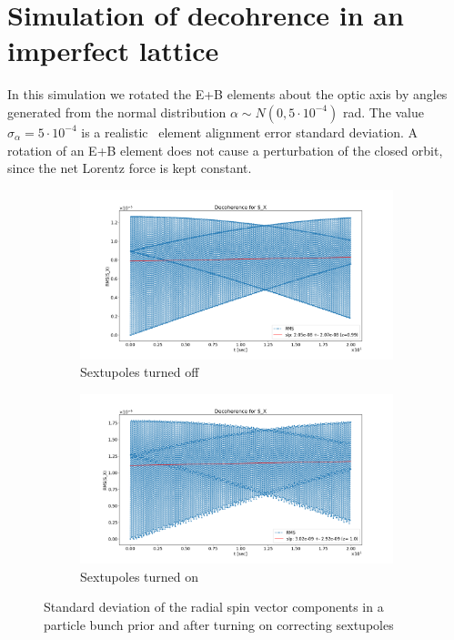 \documentclass[a4paper]{jacow}
\begin{document}
\section{Simulation of decohrence in an imperfect lattice}
In this simulation we rotated the E+B elements about the optic axis by angles generated from the normal distribution $\alpha \sim N(0, 5\cdot 10^{-4})$ rad. The value $\sigma_\alpha = 5\cdot 10^{-4}$ is a realistic~\cite{Senichev:FDM} element alignment error standard deviation. A rotation of an E+B element does not cause a perturbation of the closed orbit, since the net Lorentz force is kept constant.

\begin{figure}[h!]
  \centering
  \begin{subfigure}{\linewidth}
    \centering
    \includegraphics[width=\linewidth]{../img/IPAC19/SX_decoh_20sec_unopt}
    \caption{Sextupoles turned off}
  \end{subfigure}
  \begin{subfigure}{\linewidth}
    \centering
    \includegraphics[width=\linewidth]{../img/IPAC19/SX_decoh_20sec_opt}
    \caption{Sextupoles turned on}
  \end{subfigure}
  \caption{Standard deviation of the radial spin vector components in a particle bunch prior and after turning on correcting sextupoles\label{fig:decoh_rms_sx}}
\end{figure}
\end{document}
